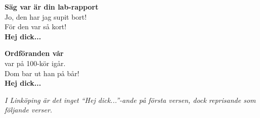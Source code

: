 \vspace{10pt}
\revrpt \textbf{Säg var är din lab-rapport}\\
Jo, den har jag supit bort!\rpt\\
För den var så kort!\\
\textbf{Hej dick...}\par
\vspace{10pt}
\revrpt\textbf{Ordföranden vår}\\
var på 100-kör igår.\rpt\\
Dom bar ut han på bår!\\
\textbf{Hej dick...}\par
\vspace{10pt}
{\footnotesize\textit{I Linköping är det inget ``Hej dick...''-ande på
    första versen, dock reprisande som följande verser.}}
